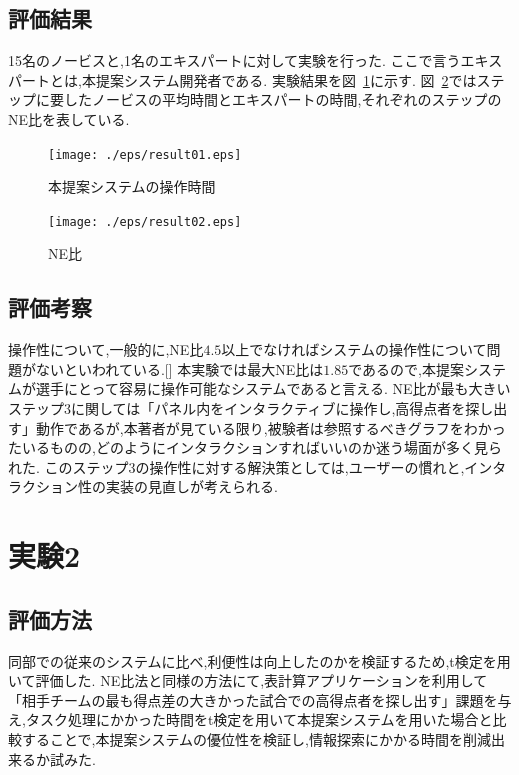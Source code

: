 \documentclass[sotsuron]{kuee}
\begin{document}
		\subsection{評価結果}
			15名のノービスと,1名のエキスパートに対して実験を行った.
			ここで言うエキスパートとは,本提案システム開発者である.
			実験結果を図~\ref{fig:result01}に示す.
			図~\ref{fig:result02}ではステップに要したノービスの平均時間とエキスパートの時間,それぞれのステップのNE比を表している.
			\begin{figure}
				\begin{center}
					\texttt{[image: ./eps/result01.eps]}
				\end{center}
				\caption{本提案システムの操作時間}
		  		\label{fig:result01}
			\end{figure}
			\begin{figure}
				\begin{center}
					\texttt{[image: ./eps/result02.eps]}
				\end{center}
				\caption{NE比}
		  		\label{fig:result02}
			\end{figure}
		\subsection{評価考察}
			操作性について,一般的に,NE比$4.5$以上でなければシステムの操作性について問題がないといわれている.[]
			本実験では最大NE比は$1.85$であるので,本提案システムが選手にとって容易に操作可能なシステムであると言える.
			NE比が最も大きいステップ3に関しては「パネル内をインタラクティブに操作し,高得点者を探し出す」動作であるが,本著者が見ている限り,被験者は参照するべきグラフをわかったいるものの,どのようにインタラクションすればいいのか迷う場面が多く見られた.
			このステップ3の操作性に対する解決策としては,ユーザーの慣れと,インタラクション性の実装の見直しが考えられる.
	\section{実験2}
		\subsection{評価方法}
			同部での従来のシステムに比べ,利便性は向上したのかを検証するため,t検定を用いて評価した.
			NE比法と同様の方法にて,表計算アプリケーションを利用して「相手チームの最も得点差の大きかった試合での高得点者を探し出す」課題を与え,タスク処理にかかった時間をt検定を用いて本提案システムを用いた場合と比較することで,本提案システムの優位性を検証し,情報探索にかかる時間を削減出来るか試みた.
\end{document}
